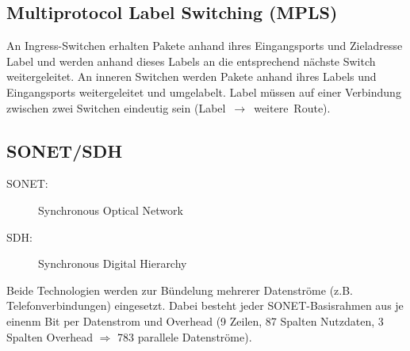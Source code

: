 \documentclass[a4paper]{article}
\begin{document}
\subsection{Multiprotocol Label Switching (MPLS)}
An Ingress-Switchen erhalten Pakete anhand ihres Eingangsports und Zieladresse Label und werden anhand dieses Labels an die entsprechend nächste Switch weitergeleitet. An inneren Switchen werden Pakete anhand ihres Labels und Eingangsports weitergeleitet und umgelabelt. Label müssen auf einer Verbindung zwischen zwei Switchen eindeutig sein (Label~$\to$~weitere~Route).

\subsection{SONET/SDH}
\begin{description}
    \item[SONET:] Synchronous Optical Network
    \item[SDH:] Synchronous Digital Hierarchy
\end{description}
Beide Technologien werden zur Bündelung mehrerer Datenströme (z.B. Telefonverbindungen) eingesetzt. Dabei besteht jeder SONET-Basisrahmen aus je einenm Bit per Datenstrom und Overhead (9 Zeilen, 87 Spalten Nutzdaten, 3 Spalten Overhead $\Rightarrow$ 783 parallele Datenströme).
\end{document}
